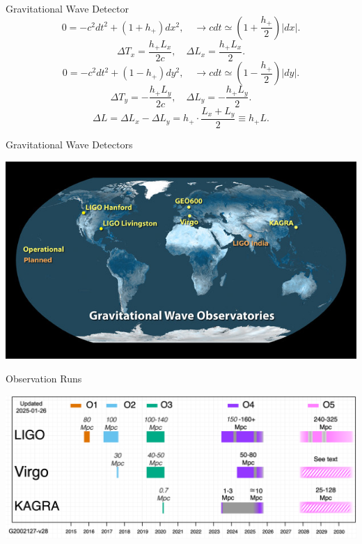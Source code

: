\documentclass[xcolor=dvipsnames]{beamer}
\begin{document}
\begin{frame}[t]{Gravitational Wave Detector}
  \begin{equation*}
    0 = -c^2 dt^2 + \left( 1 + h_+ \right) dx^2, \quad \rightarrow cdt \simeq \left( 1 + \frac{h_+}{2} \right) \left| dx \right|.
  \end{equation*}
  \begin{equation*}
    \Delta T_x = \frac{h_+ L_x}{2c}, \quad \Delta L_x = \frac{h_+ L_x}{2}.
  \end{equation*}
  \begin{equation*}
    0 = -c^2 dt^2 + \left( 1 - h_+ \right) dy^2, \quad \rightarrow cdt \simeq \left( 1 - \frac{h_+}{2} \right) \left| dy \right|.
  \end{equation*}
  \begin{equation*}
    \Delta T_y = -\frac{h_+ L_y}{2c}, \quad \Delta L_y = -\frac{h_+ L_y}{2}.
  \end{equation*}
  \begin{equation*}
    \Delta L = \Delta L_x - \Delta L_y = h_+ \cdot \frac{L_x + L_y}{2} \equiv h_+ L.
  \end{equation*}
\end{frame}

\begin{frame}[t]{Gravitational Wave Detectors}
  \begin{center}
    \includegraphics[width=\textwidth]{image/GW_Detector_Map.jpg}
  \end{center}
\end{frame}

\begin{frame}[t]{Observation Runs}
  \begin{center}
    \includegraphics[width=\textwidth]{image/ObsScen_timeline.png}
  \end{center}
\end{frame}
\end{document}
